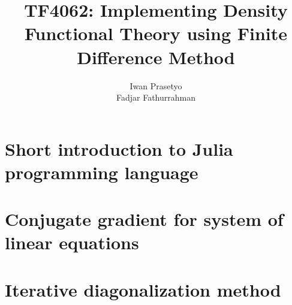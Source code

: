 \documentclass[a4paper]{article}
\begin{document}
\title{TF4062: Implementing Density Functional Theory using Finite Difference Method}
\author{Iwan Prasetyo \\
Fadjar Fathurrahman}
\date{}
\maketitle
















\appendix

\section{Short introduction to Julia programming language}

\section{Conjugate gradient for system of linear equations}

\section{Iterative diagonalization method}




\end{document}

